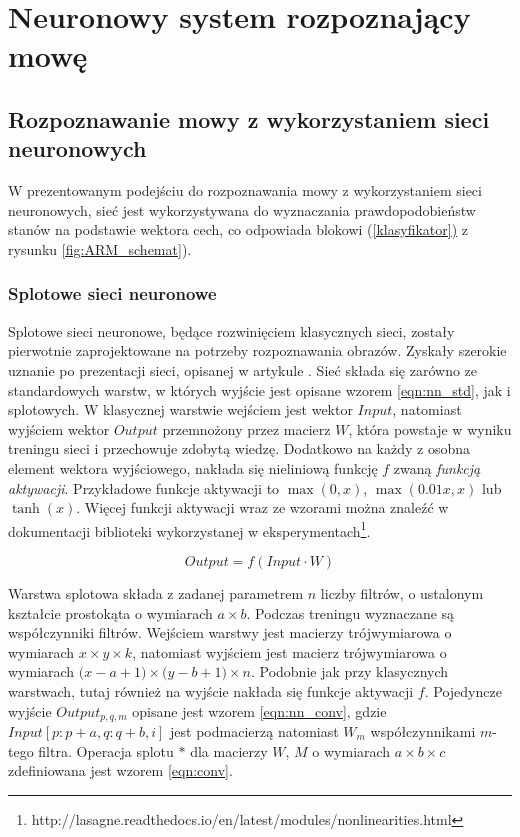 \documentclass[shortabstract, mgr]{iithesis}
\newcommand{\refBlock}[1]{(\hyperref[#1]{\ref*{#1})}
}
\begin{document}
\chapter{Neuronowy system rozpoznający mowę}
\section{Rozpoznawanie mowy z wykorzystaniem sieci neuronowych}
	\label{sec:ASR_NN}
	W prezentowanym podejściu do rozpoznawania mowy z wykorzystaniem sieci neuronowych, sieć jest wykorzystywana do wyznaczania prawdopodobieństw stanów na podstawie wektora cech, co odpowiada blokowi \refBlock{klasyfikator} z rysunku \ref{fig:ARM_schemat}).
	
	\subsection{Splotowe sieci neuronowe}
		
		Splotowe sieci neuronowe, będące rozwinięciem klasycznych sieci, zostały pierwotnie zaprojektowane na potrzeby rozpoznawania obrazów. Zyskały szerokie uznanie po prezentacji sieci, opisanej w artykule \cite{alex_net}. Sieć składa się zarówno ze standardowych warstw, w których wyjście jest opisane wzorem \ref{eqn:nn_std}, jak i splotowych.
		W klasycznej warstwie wejściem jest wektor $Input$, natomiast wyjściem wektor $Output$ przemnożony przez macierz $W$, która powstaje w wyniku treningu sieci i przechowuje zdobytą wiedzę. Dodatkowo na każdy z osobna element wektora wyjściowego, nakłada się nieliniową funkcję $f$ zwaną \textit{funkcją aktywacji}. Przykładowe funkcje aktywacji to $\max(0, x)$, $\max(0.01x, x)$ lub $\tanh(x)$. Więcej funkcji aktywacji wraz ze wzorami można znaleźć w dokumentacji biblioteki wykorzystanej w eksperymentach\footnote{http://lasagne.readthedocs.io/en/latest/modules/nonlinearities.html}. 
		
		\begin{equation}
			Output = f(Input \cdot W)
			\label{eqn:nn_std}
		\end{equation}
		
		Warstwa splotowa składa z zadanej parametrem $n$ liczby filtrów, o ustalonym kształcie prostokąta o wymiarach $a\times b$. Podczas treningu wyznaczane są współczynniki filtrów. Wejściem warstwy jest macierzy trójwymiarowa o wymiarach $x \times y \times k$, natomiast wyjściem jest macierz trójwymiarowa o wymiarach $\big(x - a + 1 \big)\times \big(y - b + 1\big) \times n$. Podobnie jak przy klasycznych warstwach, tutaj również na wyjście nakłada się funkcje aktywacji $f$. Pojedyncze wyjście $Output_{p,q,m}$ opisane jest wzorem \ref{eqn:nn_conv}, gdzie $Input[p:p+a, q:q+b, i]$ jest podmacierzą natomiast $W_m$ współczynnikami $m$-tego filtra. Operacja splotu $\ast$ dla macierzy $W$, $M$ o wymiarach $a\times b\times c$ zdefiniowana jest wzorem \ref{eqn:conv}.
		
\end{document}
